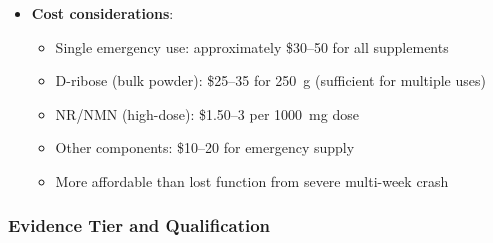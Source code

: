 \begin{itemize}
    \item \textbf{Cost considerations}:
    \begin{itemize}
        \item Single emergency use: approximately \$30--50 for all supplements
        \item D-ribose (bulk powder): \$25--35 for 250~g (sufficient for multiple uses)
        \item NR/NMN (high-dose): \$1.50--3 per 1000~mg dose
        \item Other components: \$10--20 for emergency supply
        \item More affordable than lost function from severe multi-week crash
    \end{itemize}
\end{itemize}

\subsubsection{Evidence Tier and Qualification}

